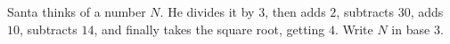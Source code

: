 Santa thinks of a number $N$. He divides it by $3$, then adds $2$, subtracts $30$, adds $10$, subtracts $14$, and finally takes the square root, getting $4$. Write $N$ in base $3$.
